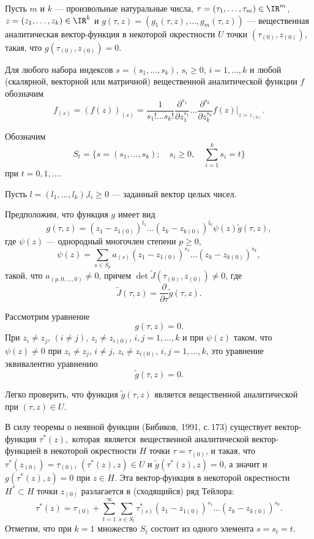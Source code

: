 Пусть $m$ и $k$ --- произвольные натуральные числа,
$\tau=(\tau_1,\ldots,\tau_m) \in {\IR}^m$, $z=(z_1,\ldots,z_k)\in
{\IR}^k$ и $g(\tau,z)=(g_1(\tau,z), \ldots,g_m(\tau,z))$ ---
вещественная аналитическая вектор-функция в некоторой окрестности
$U$ точки $(\tau_{(0)},z_{(0)})$, такая, что
$g(\tau_{(0)},z_{(0)})=0$.

Для любого набора индексов $s=(s_1,\ldots,s_k)$, $s_i\geq 0$,
$i=1,\ldots,k$ и любой (скалярной, векторной или матричной)
вещественной аналитической функции $f$ обозначим
$$
f_{(s)}=\left(f(z)\right)_{(s)}=\frac{1}{s_1!\ldots s_k!}
\frac{\partial^{s_1}}{\partial z_1^{s_1}}\ldots
\frac{\partial^{s_k}}{\partial z_k^{s_k}} f(z)|_{z=z_{(0)}}.
$$

Обозначим
$$
S_t=\{s=(s_1,\ldots,s_k);\quad s_i\geq 0,\quad \sum^k_{i=1} s_i=t\}
$$
при $t=0,1,\ldots$.

Пусть $l=(l_1,\ldots,l_k)$,$l_i\geq 0$ --- заданный вектор целых
чисел.

Предположим, что функция $g$ имеет вид
$$
g(\tau,z)=(z_1-z_{1(0)})^{l_1}\ldots (z_k-z_{k(0)})^{l_k}
\psi(z)\tilde g(\tau,z),
$$
где $\psi(z)$ --- однородный многочлен степени $p\geq 0$,
$$
\psi(z)=\sum_{s\in S_p}a_{(s)}(z_1-z_{1(0)})^{s_1}\ldots
(z_k-z_{k(0)})^{s_k},
$$
такой, что $a_{(p,0,\ldots,0)}\ne 0$, причем $\det \tilde
J(\tau_{(0)},z_{(0)})\ne 0$, где
$$
\tilde J(\tau,z)=\frac{\partial}{\partial\tau}\tilde g(\tau,z).
$$

Рассмотрим уравнение
$$
g(\tau,z)=0.
$$
При $z_i\ne z_j$, $(i\ne j)$, $z_i\ne z_{i(0)}$, $i,j=1,\ldots,k$ и
при $\psi(z)$ таком, что $\psi(z)\ne 0$ при $z_i\ne z_j$, $i\ne j$,
$z_i\ne z_{i(0)}$, $i,j=1,\ldots,k$, это уравнение эквивалентно
уравнению
$$
\tilde g(\tau,z)=0.
$$

Легко проверить, что функция $\tilde g(\tau,z)$ является
вещественной аналитической при $(\tau,z)\in U$.

В силу теоремы о неявной функции (Бибиков, 1991, с.\,173) существует
вектор-функция $\tau^*(z)$,\, которая\, является\,
ве\-ще\-ст\-вен\-ной аналитической вектор-функцией в некоторой
окрестности $H$ точки $\tau=\tau_{(0)}$, и такая, что
$\tau^*(z_{(0)})=\tau_{(0)}$, $(\tau^*(z),z)\in U$ и $\tilde
g(\tau^*(z),z)=0$, а значит и $ g(\tau^*(z),z)=0$ при $z\in H$. Эта
вектор-функция в некоторой окрестности $H^*\subset H$ точки
$z_{(0)}$ разлагается в (сходящийся) ряд Тейлора:
$$
\tau^*(z)=\tau_{(0)}+ \sum^\infty_{t=1}\sum_{s\in S_t}
\tau^*_{(s)}(z_1- z_{1(0)})^{s_1}\ldots(z_k-z_{k(0)})^{s_k}.
$$
Отметим, что при $k=1$ множество $S_t$ состоит из одного элемента
$s=s_t=t$.

